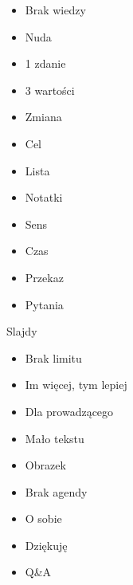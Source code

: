 \documentclass{beamer}
\begin{document}
\begin{frame}{}
	\begin{Large}
		\begin{itemize}[<+->]
			\item Brak wiedzy
			\item Nuda
			\item 1 zdanie
			\item 3 wartości
			\item Zmiana
			\item Cel
		\end{itemize}
	\end{Large}
\end{frame}

\begin{frame}{}
	\begin{Large}
		\begin{itemize}[<+->]
			\item Lista
			\item Notatki
			\item Sens
			\item Czas
			\item Przekaz
			\item Pytania
		\end{itemize}
	\end{Large}
\end{frame}

\begin{frame}{}
	\begin{center}
		\Huge{Slajdy}
	\end{center}
\end{frame}

\begin{frame}{}
	\begin{Large}
		\begin{itemize}[<+->]
			\item Brak limitu
			\item Im więcej, tym lepiej
			\item Dla prowadzącego
			\item Mało tekstu
			\item Obrazek
		\end{itemize}
	\end{Large}
\end{frame}

\begin{frame}{}
	\begin{Large}
		\begin{itemize}[<+->]
			\item Brak agendy
			\item O sobie
			\item Dziękuję
			\item Q\&A
		\end{itemize}
	\end{Large}
\end{frame}
\end{document}
